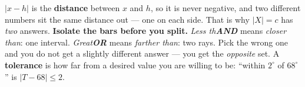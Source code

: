\documentclass[12pt]{article}
\begin{document}
\vspace{0.14in}

\boxguard[8]
\begin{remindbox}
\small
$|x-h|$ is the \textbf{distance} between $x$ and $h$, so it is never negative, and two different
numbers sit the same distance out --- one on each side. That is why $|X|=c$ has \emph{two}
answers. \textbf{Isolate the bars before you split.} \emph{Less th\textbf{AND}} means
\emph{closer than}: one interval. \emph{Great\textbf{OR}} means \emph{farther than}: two rays.
Pick the wrong one and you do not get a slightly different answer --- you get the
\emph{opposite} set. A \textbf{tolerance} is how far from a desired value you are willing to be:
``within $2^\circ$ of $68^\circ$'' is $|T-68|\le 2$.
\end{remindbox}
\end{document}

